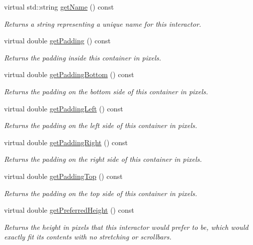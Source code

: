 \begin{DoxyCompactItemize}
virtual std\+::string \mbox{\hyperlink{classsgl_1_1GInteractor_a8a60438a5b55d0b2ceb35c8674b9d8c5}{get\+Name}} () const
\begin{DoxyCompactList}\small\item\em Returns a string representing a unique name for this interactor. \end{DoxyCompactList}\item 
virtual double \mbox{\hyperlink{classsgl_1_1GContainer_a19fdf4f4500aead343992102066983cb}{get\+Padding}} () const
\begin{DoxyCompactList}\small\item\em Returns the padding inside this container in pixels. \end{DoxyCompactList}\item 
virtual double \mbox{\hyperlink{classsgl_1_1GContainer_a5696e2debbbafb717c0d47e069b896e4}{get\+Padding\+Bottom}} () const
\begin{DoxyCompactList}\small\item\em Returns the padding on the bottom side of this container in pixels. \end{DoxyCompactList}\item 
virtual double \mbox{\hyperlink{classsgl_1_1GContainer_af28748a6467a4d3337788578522fa8f4}{get\+Padding\+Left}} () const
\begin{DoxyCompactList}\small\item\em Returns the padding on the left side of this container in pixels. \end{DoxyCompactList}\item 
virtual double \mbox{\hyperlink{classsgl_1_1GContainer_a8d75cea586f7cd6611432122a080ecce}{get\+Padding\+Right}} () const
\begin{DoxyCompactList}\small\item\em Returns the padding on the right side of this container in pixels. \end{DoxyCompactList}\item 
virtual double \mbox{\hyperlink{classsgl_1_1GContainer_ada97c35b2f3366886a49d63fff9d7bd4}{get\+Padding\+Top}} () const
\begin{DoxyCompactList}\small\item\em Returns the padding on the top side of this container in pixels. \end{DoxyCompactList}\item 
virtual double \mbox{\hyperlink{classsgl_1_1GInteractor_a747de0961653847bdc6615dbf756d715}{get\+Preferred\+Height}} () const
\begin{DoxyCompactList}\small\item\em Returns the height in pixels that this interactor would prefer to be, which would exactly fit its contents with no stretching or scrollbars. \end{DoxyCompactList}\item 

\end{DoxyCompactItemize}

